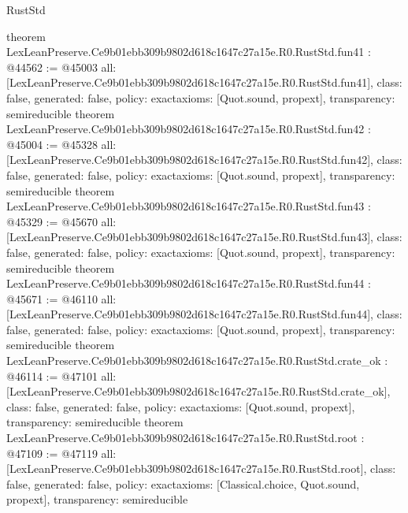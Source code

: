 \begin{lexlean}{RustStd}
\begin{coremodule}
{}
theorem LexLeanPreserve.Ce9b01ebb309b9802d618c1647c27a15e.R0.RustStd.fun41 : @44562 := @45003 {
  all: [LexLeanPreserve.Ce9b01ebb309b9802d618c1647c27a15e.R0.RustStd.fun41],
  class: false,
  generated: false,
  policy: exact{axioms: [Quot.sound, propext]},
  transparency: semireducible
}
theorem LexLeanPreserve.Ce9b01ebb309b9802d618c1647c27a15e.R0.RustStd.fun42 : @45004 := @45328 {
  all: [LexLeanPreserve.Ce9b01ebb309b9802d618c1647c27a15e.R0.RustStd.fun42],
  class: false,
  generated: false,
  policy: exact{axioms: [Quot.sound, propext]},
  transparency: semireducible
}
theorem LexLeanPreserve.Ce9b01ebb309b9802d618c1647c27a15e.R0.RustStd.fun43 : @45329 := @45670 {
  all: [LexLeanPreserve.Ce9b01ebb309b9802d618c1647c27a15e.R0.RustStd.fun43],
  class: false,
  generated: false,
  policy: exact{axioms: [Quot.sound, propext]},
  transparency: semireducible
}
theorem LexLeanPreserve.Ce9b01ebb309b9802d618c1647c27a15e.R0.RustStd.fun44 : @45671 := @46110 {
  all: [LexLeanPreserve.Ce9b01ebb309b9802d618c1647c27a15e.R0.RustStd.fun44],
  class: false,
  generated: false,
  policy: exact{axioms: [Quot.sound, propext]},
  transparency: semireducible
}
theorem LexLeanPreserve.Ce9b01ebb309b9802d618c1647c27a15e.R0.RustStd.crate_ok : @46114 := @47101 {
  all: [LexLeanPreserve.Ce9b01ebb309b9802d618c1647c27a15e.R0.RustStd.crate_ok],
  class: false,
  generated: false,
  policy: exact{axioms: [Quot.sound, propext]},
  transparency: semireducible
}
theorem LexLeanPreserve.Ce9b01ebb309b9802d618c1647c27a15e.R0.RustStd.root : @47109 := @47119 {
  all: [LexLeanPreserve.Ce9b01ebb309b9802d618c1647c27a15e.R0.RustStd.root],
  class: false,
  generated: false,
  policy: exact{axioms: [Classical.choice, Quot.sound, propext]},
  transparency: semireducible
}


\end{coremodule}
\end{lexlean}
